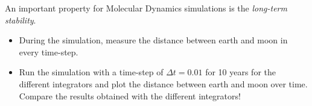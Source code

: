An important property for Molecular Dynamics simulations is the
\emph{long-term stability}.

\begin{task}[3]
  \begin{itemize}
  \item During the simulation, measure the distance between earth and
    moon in every time-step.
  \item Run the simulation with a time-step of $\Delta t=0.01$ for 10
    years for the different integrators and plot the distance between
    earth and moon over time. Compare the results obtained with the
    different integrators!
  \end{itemize}
\end{task}



